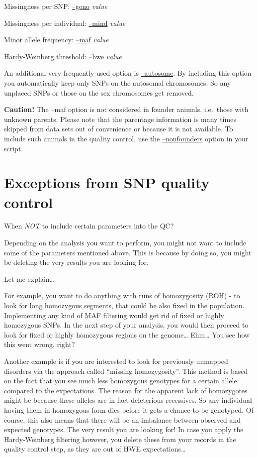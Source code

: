 \documentclass[]{book}
\begin{document}
Missingness per SNP:
\href{https://www.cog-genomics.org/plink/1.9/filter\#missing}{--geno}
\emph{value}

Missingness per individual:
\href{https://www.cog-genomics.org/plink/1.9/filter\#missing}{--mind}
\emph{value}

Minor allele frequency:
\href{https://www.cog-genomics.org/plink/1.9/filter\#maf}{--maf}
\emph{value}

Hardy-Weinberg threshold:
\href{https://www.cog-genomics.org/plink/1.9/filter\#hwe}{--hwe}
\emph{value}

An additional very frequently used option is
\href{https://www.cog-genomics.org/plink/1.9/filter\#autosome}{--autosome}.
By including this option you automatically keep only SNPs on the
autosomal chromosomes. So any unplaced SNPs or those on the sex
chromosomes get removed.

\textbf{Caution!} The --maf option is not considered in founder animals,
i.e.~those with unknown parents. Please note that the parentage
information is many times skipped from data sets out of convenience or
because it is not available. To include such animals in the quality
control, use the
\href{https://www.cog-genomics.org/plink/1.9/filter\#nonfounders}{--nonfounders}
option in your script.

\section{Exceptions from SNP quality
control}\label{exceptions-from-snp-quality-control}

When \emph{NOT} to include certain parameters into the QC?

Depending on the analysis you want to perform, you might not want to
include some of the parameters mentioned above. This is because by doing
so, you might be deleting the very results you are looking for.

Let me explain\ldots{}

For example, you want to do anything with runs of homozygosity (ROH) -
to look for long homozygous segments, that could be also fixed in the
population. Implementing any kind of MAF filtering would get rid of
fixed or highly homozygous SNPs. In the next step of your analysis, you
would then proceed to look for fixed or highly homozygous regions on the
genome\ldots{} Ehm\ldots{} You see how this went wrong, right?

Another example is if you are interested to look for previously unmapped
disorders via the approach called ``missing homozygosity''. This method
is based on the fact that you see much less homozygous genotypes for a
certain allele compared to the expectations. The reason for the apparent
lack of homozygotes might be because these alleles are in fact
deleterious recessives. So any individual having them in homozygous form
dies before it gets a chance to be genotyped. Of course, this also means
that there will be an imbalance between observed and expected genotypes.
The very result you are looking for! In case you apply the
Hardy-Weinberg filtering however, you delete these from your records in
the quality control step, as they are out of HWE expectations\ldots{}
\end{document}
